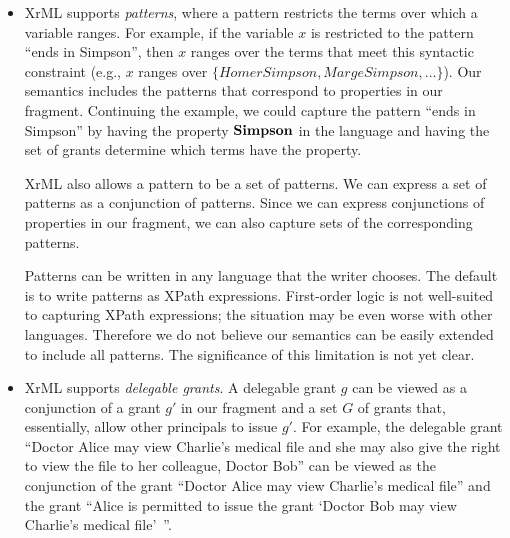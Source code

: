 \documentclass{acmtrans2m}
\newcommand{\<}{
}
\renewcommand{\>}{\rangle}
\begin{document}
\begin{itemize}
\item XrML supports \emph{patterns}, where a pattern restricts the terms over which a variable
ranges. For example, if the variable $x$ is restricted to the pattern ``ends in Simpson'', then
$x$ ranges over the terms that meet this syntactic constraint (e.g., $x$ ranges over
$\{Homer Simpson, Marge Simpson, \ldots\}$).
Our semantics includes the patterns that correspond to properties in our fragment.
Continuing the example, we could capture the pattern ``ends in Simpson''
by having the property  $\mathit{\bf Simpson}$ in the
language and having the set of grants determine which terms have the property.



XrML
also
allows a pattern to be a set of patterns.  We can express a set of patterns as a
conjunction of patterns.  Since we can express conjunctions of
properties in our fragment, we can
also capture sets
of the corresponding patterns.

Patterns can be written in any language that the writer chooses.  The default is to
write patterns as XPath expressions.  First-order logic is not
well-suited to capturing
XPath expressions; the situation may be even worse with other languages.
Therefore we do not believe our semantics can be easily extended to
include all patterns.
The significance of this limitation is not yet clear.

\item XrML supports \emph{delegable grants}.  A delegable grant $g$ can be viewed as a conjunction of a
grant $g'$ in our fragment and a set $G$ of grants that, essentially, allow other principals to issue $g'$.
For example, the delegable grant ``Doctor Alice may view Charlie's medical file and she may also give the
right to view the file
to her colleague, Doctor Bob'' can be viewed as the conjunction of the grant
``Doctor Alice may view Charlie's medical file'' and the grant ``Alice is permitted to issue the grant
`Doctor Bob may view Charlie's medical file'\, ''.


\end{itemize}
\end{document}
